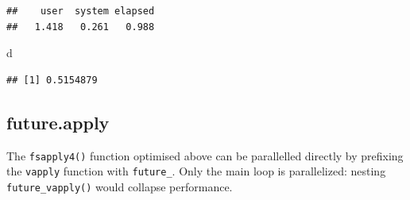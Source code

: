 \documentclass[
  12pt,
  american,
  a4paper,
  extrafontsizes,onecolumn,openright
  ]{memoir}
\newenvironment{Shaded}{\begin{snugshade}}{\end{snugshade}}
\newcommand{\NormalTok}[1]{#1}
\newlength{\rf}
\begin{document}
\begin{verbatim}
##    user  system elapsed 
##   1.418   0.261   0.988
\end{verbatim}

\begin{Shaded}
\begin{Highlighting}[]
\NormalTok{d}
\end{Highlighting}
\end{Shaded}

\begin{verbatim}
## [1] 0.5154879
\end{verbatim}

\normalsize

\subsection{future.apply}\label{future.apply}

The \texttt{fsapply4()} function optimised above can be parallelled directly by prefixing the \texttt{vapply} function with \texttt{future\_}.
Only the main loop is parallelized: nesting \texttt{future\_vapply()} would collapse performance.

\scriptsize
\end{document}
